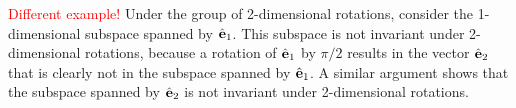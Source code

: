 \begin{example}
    \textcolor{red}{Different example!}
    Under the group of 2-dimensional rotations, consider the 1-dimensional subspace spanned by $\hat{\mathbf{e}}_1$. This subspace is not invariant under 2-dimensional rotations, because a rotation of $\hat{\mathbf{e}}_1$ by $\pi/2$ results in the vector $\hat{\mathbf{e}}_2$ that is clearly not in the subspace spanned by $\hat{\mathbf{e}}_1$. A similar argument shows that the subspace spanned by $\hat{\mathbf{e}}_2$ is not invariant under 2-dimensional rotations.



\end{example}
